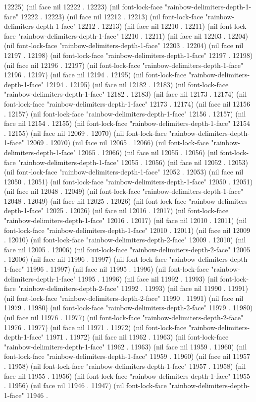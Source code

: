 12225) (nil face nil 12222 . 12223) (nil font-lock-face "rainbow-delimiters-depth-1-face" 12222 . 12223) (nil face nil 12212 . 12213) (nil font-lock-face "rainbow-delimiters-depth-1-face" 12212 . 12213) (nil face nil 12210 . 12211) (nil font-lock-face "rainbow-delimiters-depth-1-face" 12210 . 12211) (nil face nil 12203 . 12204) (nil font-lock-face "rainbow-delimiters-depth-1-face" 12203 . 12204) (nil face nil 12197 . 12198) (nil font-lock-face "rainbow-delimiters-depth-1-face" 12197 . 12198) (nil face nil 12196 . 12197) (nil font-lock-face "rainbow-delimiters-depth-1-face" 12196 . 12197) (nil face nil 12194 . 12195) (nil font-lock-face "rainbow-delimiters-depth-1-face" 12194 . 12195) (nil face nil 12182 . 12183) (nil font-lock-face "rainbow-delimiters-depth-1-face" 12182 . 12183) (nil face nil 12173 . 12174) (nil font-lock-face "rainbow-delimiters-depth-1-face" 12173 . 12174) (nil face nil 12156 . 12157) (nil font-lock-face "rainbow-delimiters-depth-1-face" 12156 . 12157) (nil face nil 12154 . 12155) (nil font-lock-face "rainbow-delimiters-depth-1-face" 12154 . 12155) (nil face nil 12069 . 12070) (nil font-lock-face "rainbow-delimiters-depth-1-face" 12069 . 12070) (nil face nil 12065 . 12066) (nil font-lock-face "rainbow-delimiters-depth-1-face" 12065 . 12066) (nil face nil 12055 . 12056) (nil font-lock-face "rainbow-delimiters-depth-1-face" 12055 . 12056) (nil face nil 12052 . 12053) (nil font-lock-face "rainbow-delimiters-depth-1-face" 12052 . 12053) (nil face nil 12050 . 12051) (nil font-lock-face "rainbow-delimiters-depth-1-face" 12050 . 12051) (nil face nil 12048 . 12049) (nil font-lock-face "rainbow-delimiters-depth-1-face" 12048 . 12049) (nil face nil 12025 . 12026) (nil font-lock-face "rainbow-delimiters-depth-1-face" 12025 . 12026) (nil face nil 12016 . 12017) (nil font-lock-face "rainbow-delimiters-depth-1-face" 12016 . 12017) (nil face nil 12010 . 12011) (nil font-lock-face "rainbow-delimiters-depth-1-face" 12010 . 12011) (nil face nil 12009 . 12010) (nil font-lock-face "rainbow-delimiters-depth-2-face" 12009 . 12010) (nil face nil 12005 . 12006) (nil font-lock-face "rainbow-delimiters-depth-2-face" 12005 . 12006) (nil face nil 11996 . 11997) (nil font-lock-face "rainbow-delimiters-depth-1-face" 11996 . 11997) (nil face nil 11995 . 11996) (nil font-lock-face "rainbow-delimiters-depth-1-face" 11995 . 11996) (nil face nil 11992 . 11993) (nil font-lock-face "rainbow-delimiters-depth-2-face" 11992 . 11993) (nil face nil 11990 . 11991) (nil font-lock-face "rainbow-delimiters-depth-2-face" 11990 . 11991) (nil face nil 11979 . 11980) (nil font-lock-face "rainbow-delimiters-depth-2-face" 11979 . 11980) (nil face nil 11976 . 11977) (nil font-lock-face "rainbow-delimiters-depth-2-face" 11976 . 11977) (nil face nil 11971 . 11972) (nil font-lock-face "rainbow-delimiters-depth-1-face" 11971 . 11972) (nil face nil 11962 . 11963) (nil font-lock-face "rainbow-delimiters-depth-1-face" 11962 . 11963) (nil face nil 11959 . 11960) (nil font-lock-face "rainbow-delimiters-depth-1-face" 11959 . 11960) (nil face nil 11957 . 11958) (nil font-lock-face "rainbow-delimiters-depth-1-face" 11957 . 11958) (nil face nil 11955 . 11956) (nil font-lock-face "rainbow-delimiters-depth-1-face" 11955 . 11956) (nil face nil 11946 . 11947) (nil font-lock-face "rainbow-delimiters-depth-1-face" 11946 . 